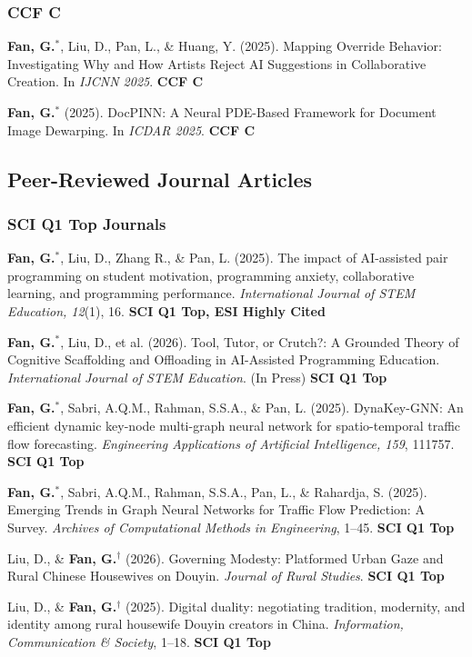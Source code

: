 \documentclass[a4paper,9pt]{extarticle}
\newcommand{\pubitem}[1]{\item #1}
\begin{document}
\subsubsection*{CCF C}

\begin{enumerate}[label={[C\arabic*]}, resume]
    \pubitem{\textbf{Fan, G.}$^*$, Liu, D., Pan, L., \& Huang, Y. (2025). Mapping Override Behavior: Investigating Why and How Artists Reject AI Suggestions in Collaborative Creation. In \textit{IJCNN 2025}. \textbf{CCF C}}
    
    \pubitem{\textbf{Fan, G.}$^*$ (2025). DocPINN: A Neural PDE-Based Framework for Document Image Dewarping. In \textit{ICDAR 2025}. \textbf{CCF C}}
\end{enumerate}

\subsection*{Peer-Reviewed Journal Articles}

\subsubsection*{SCI Q1 Top Journals}

\begin{enumerate}[label={[J\arabic*]}]
    \pubitem{\textbf{Fan, G.}$^*$, Liu, D., Zhang R., \& Pan, L. (2025). The impact of AI-assisted pair programming on student motivation, programming anxiety, collaborative learning, and programming performance. \textit{International Journal of STEM Education, 12}(1), 16. \textbf{SCI Q1 Top, ESI Highly Cited}}
    
    \pubitem{\textbf{Fan, G.}$^*$, Liu, D., et al. (2026). Tool, Tutor, or Crutch?: A Grounded Theory of Cognitive Scaffolding and Offloading in AI-Assisted Programming Education. \textit{International Journal of STEM Education}. (In Press) \textbf{SCI Q1 Top}}
    
    \pubitem{\textbf{Fan, G.}$^*$, Sabri, A.Q.M., Rahman, S.S.A., \& Pan, L. (2025). DynaKey-GNN: An efficient dynamic key-node multi-graph neural network for spatio-temporal traffic flow forecasting. \textit{Engineering Applications of Artificial Intelligence, 159}, 111757. \textbf{SCI Q1 Top}}
    
    \pubitem{\textbf{Fan, G.}$^*$, Sabri, A.Q.M., Rahman, S.S.A., Pan, L., \& Rahardja, S. (2025). Emerging Trends in Graph Neural Networks for Traffic Flow Prediction: A Survey. \textit{Archives of Computational Methods in Engineering}, 1--45. \textbf{SCI Q1 Top}}
    
    \pubitem{Liu, D., \& \textbf{Fan, G.}$^\dag$ (2026). Governing Modesty: Platformed Urban Gaze and Rural Chinese Housewives on Douyin. \textit{Journal of Rural Studies}. \textbf{SCI Q1 Top}}
    
    \pubitem{Liu, D., \& \textbf{Fan, G.}$^\dag$ (2025). Digital duality: negotiating tradition, modernity, and identity among rural housewife Douyin creators in China. \textit{Information, Communication \& Society}, 1--18. \textbf{SCI Q1 Top}}
\end{enumerate}
\end{document}
